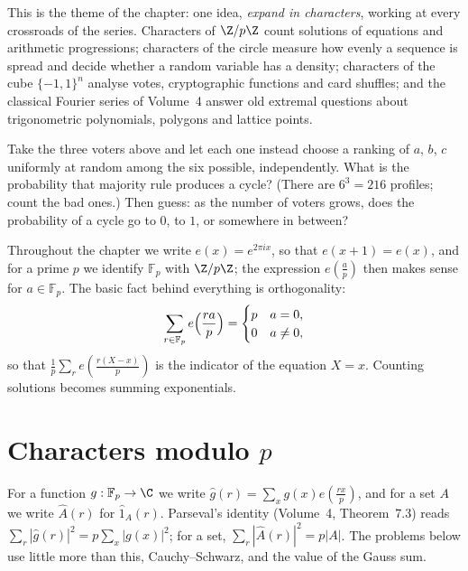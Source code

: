 This is the theme of the chapter: one idea, \emph{expand in characters}, working at every crossroads of the series. Characters of
$\Z/p\Z$ count solutions of equations and arithmetic progressions; characters of the circle measure how evenly a sequence is
spread and decide whether a random variable has a density; characters of the cube $\{-1,1\}^n$ analyse votes, cryptographic
functions and card shuffles; and the classical Fourier series of Volume~4 answer old extremal questions about trigonometric
polynomials, polygons and lattice points.

\begin{think}
Take the three voters above and let each one instead choose a ranking of $a$, $b$, $c$ uniformly at random among the six possible,
independently. What is the probability that majority rule produces a cycle? (There are $6^3=216$ profiles; count the bad ones.)
Then guess: as the number of voters grows, does the probability of a cycle go to $0$, to $1$, or somewhere in between?
\end{think}

Throughout the chapter we write $e(x)=e^{2\pi ix}$, so that $e(x+1)=e(x)$, and for a prime $p$ we identify $\mathbb F_p$ with
$\Z/p\Z$; the expression $e(\frac ap)$ then makes sense for $a\in\mathbb F_p$. The basic fact behind everything is orthogonality:
\[
\sum_{r\in\mathbb F_p}e\Bigl(\frac{ra}p\Bigr)=\begin{cases}p&a=0,\\0&a\ne0,\end{cases}
\]
so that $\frac1p\sum_re(\frac{r(X-x)}p)$ is the indicator of the equation $X=x$. Counting solutions becomes summing exponentials.

\section{Characters modulo $p$}

For a function $g:\mathbb F_p\to\C$ we write $\hat g(r)=\sum_xg(x)e(\frac{rx}p)$, and for a set $A$ we write $\hat A(r)$ for $\hat 1_A(r)$. Parseval's
identity (Volume~4, Theorem~7.3) reads $\sum_r|\hat g(r)|^2=p\sum_x|g(x)|^2$; for a set, $\sum_r|\hat A(r)|^2=p|A|$. The problems below use
little more than this, Cauchy--Schwarz, and the value of the Gauss sum.

